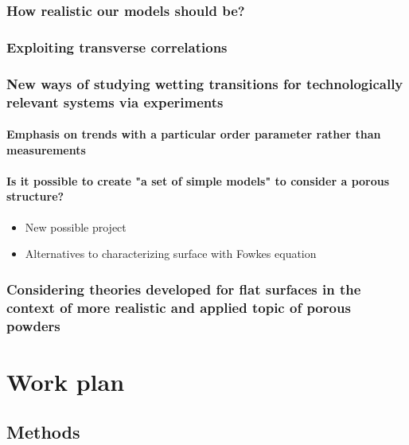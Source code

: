 \documentclass[a4paper,12pt,single,pdftex]{article}
\begin{document}
\label{ID_1997632539}\subsubsection{How realistic our models should be?}

\label{ID_625214648}\subsubsection{Exploiting transverse correlations}

\label{ID_1607535616}\subsubsection{New ways of studying wetting transitions for technologically relevant systems via experiments}

\label{ID_825518109}\paragraph{Emphasis on trends with a particular order parameter rather than measurements}

\label{ID_1028951925}\paragraph{Is it possible to create "a set of simple models" to consider a porous structure?}

\begin{itemize}
\label{ID_1602351942}\item New possible project
\label{ID_714004449}\item Alternatives to characterizing surface with Fowkes equation
\end{itemize}
\label{ID_1602351942}\label{ID_714004449}\label{ID_30899692}\subsubsection{Considering theories developed for flat surfaces in the context of more realistic and applied topic of porous powders}

\label{ID_1615838882}\section{Work plan}

\label{ID_1509493354}\subsection{Methods}
\end{document}
